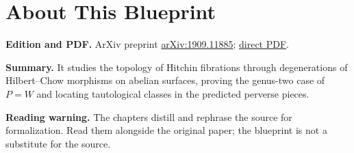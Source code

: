 

\chapter*{About This Blueprint}
\label{hitchin-fibrations-abelian-surfaces-pw-about}


\textbf{Edition and PDF.} ArXiv preprint \href{https://arxiv.org/abs/1909.11885}{arXiv:1909.11885}; \href{https://arxiv.org/pdf/1909.11885}{direct PDF}.

\textbf{Summary.} It studies the topology of Hitchin fibrations through degenerations of Hilbert--Chow morphisms on abelian surfaces, proving the genus-two case of $P=W$ and locating tautological classes in the predicted perverse pieces.

\textbf{Reading warning.} The chapters distill and rephrase the source for formalization. Read them alongside the original paper; the blueprint is not a substitute for the source.











